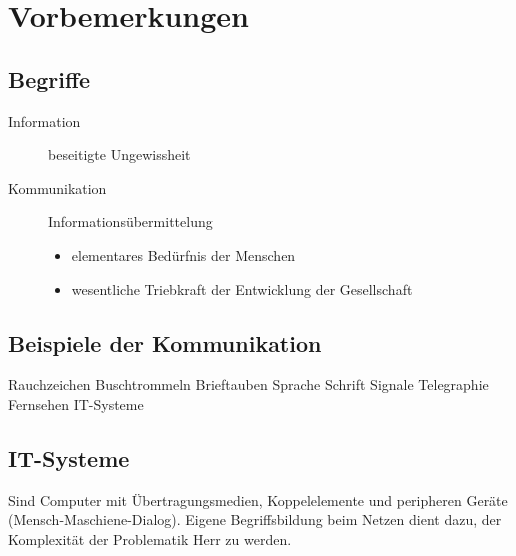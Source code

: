 \chapter{Vorbemerkungen}

\section{Begriffe}

\begin{description}
\item[Information] beseitigte Ungewissheit
\item[Kommunikation] Informationsübermittelung
\begin{itemize}
\item elementares Bedürfnis der Menschen 
\item wesentliche Triebkraft der Entwicklung der Gesellschaft
\end{itemize}
\end{description}

\section{Beispiele der Kommunikation}
Rauchzeichen
Buschtrommeln
Brieftauben
Sprache
Schrift
Signale
Telegraphie
Fernsehen
IT-Systeme

\section{IT-Systeme}
Sind Computer mit Übertragungsmedien, Koppelelemente und peripheren Geräte (Mensch-Maschiene-Dialog). Eigene Begriffsbildung beim Netzen dient dazu, der Komplexität der Problematik Herr zu werden. 
